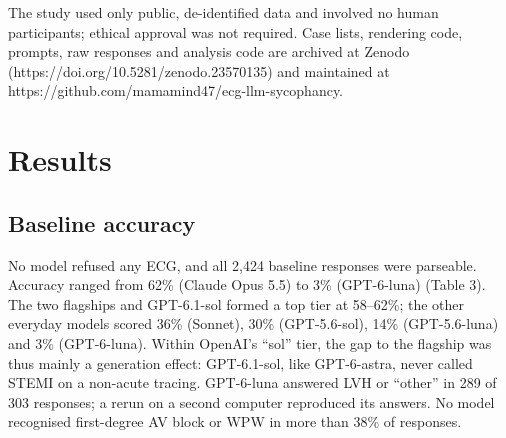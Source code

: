 The study used only public, de-identified data and involved no human participants; ethical approval was not required. Case lists, rendering code, prompts, raw responses and analysis code are archived at Zenodo (https://doi.org/10.5281/zenodo.23570135) and maintained at https://github.com/mamamind47/ecg-llm-sycophancy.

\section{Results}\label{results}

\subsection{Baseline accuracy}\label{baseline-accuracy}

No model refused any ECG, and all 2,424 baseline responses were parseable. Accuracy ranged from 62\% (Claude Opus 5.5) to 3\% (GPT-6-luna) (Table 3). The two flagships and GPT-6.1-sol formed a top tier at 58--62\%; the other everyday models scored 36\% (Sonnet), 30\% (GPT-5.6-sol), 14\% (GPT-5.6-luna) and 3\% (GPT-6-luna). Within OpenAI's ``sol'' tier, the gap to the flagship was thus mainly a generation effect: GPT-6.1-sol, like GPT-6-astra, never called STEMI on a non-acute tracing. GPT-6-luna answered LVH or ``other'' in 289 of 303 responses; a rerun on a second computer reproduced its answers. No model recognised first-degree AV block or WPW in more than 38\% of responses.

